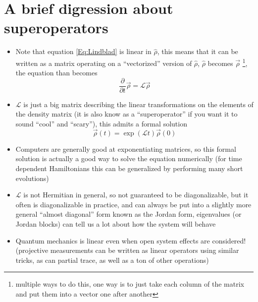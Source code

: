 \documentclass[english]{article}
\begin{document}
\section{A brief digression about superoperators}

\begin{itemize}
\item Note that equation \ref{Eq:Lindblad} is linear in $\hat{\rho}$, this means that it can be written as a matrix operating on a ``vectorized'' version of $\hat{\rho}$,  $\hat{\rho}$ becomes $\vec{\rho}$ \footnote{multiple ways to do this, one way is to just take each column of the matrix and put them into a vector one after another}, the equation than becomes
\begin{equation}
\frac{\partial}{\partial t}\vec{\rho}=\mathcal{L}\vec{\rho}
\end{equation}
\item $\mathcal{L}$ is just a big matrix describing the linear transformations on the elements of the density matrix (it is also know as a ``superoperator'' if you want it to sound ``cool'' and ``scary''), this admits a formal solution
\begin{equation}
\vec{\rho}(t)=\exp(\mathcal{L} t)\vec{\rho}(0)
\end{equation}
\item Computers are generally good at exponentiating matrices, so this formal solution  is actually a good way to solve the equation numerically (for time dependent Hamiltonians this can be generalized by performing many short evolutions)
\item $\mathcal{L}$ is not Hermitian in general, so not guaranteed to be diagonalizable, but it often is diagonalizable in practice, and can always be put into a slightly more general ``almost diagonal'' form known as the Jordan form, eigenvalues (or Jordan blocks) can tell us a lot about how the system will behave
\item Quantum mechanics is linear even when open system effects are considered! (projective measurements can be written as linear operators using similar tricks, as can partial trace, as well as a ton of other operations)
\end{itemize}
\end{document}
